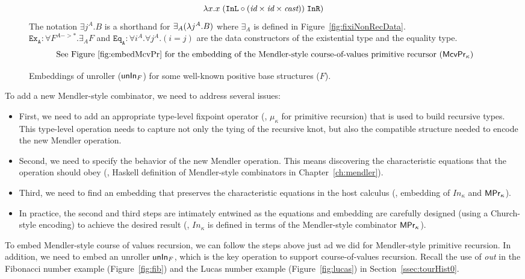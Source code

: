 {\begin{landscape}
\begin{figure}
\[\lambda x. x \;(\texttt{InL}\circ
		(\textit{id}\times\textit{id}\times\textit{cast}))
	\;\texttt{InR})
\]
The notation $\exists j^A.B$ is a shorthand for $\exists_A(\lambda j^A.B)$
where $\exists_A$ is defined in Figure~\ref{fig:fixiNonRecData}.\\
$\mathtt{Ex_{A}} : \forall F^{A -> *}.\exists_A F$ and
$\mathtt{Eq_{A}} : \forall i^A.\forall j^A.(i=j)$ are
the data constructors of the existential type and the equality type.
\[\text{
See Figure \ref{fig:embedMcvPr} for the embedding of the Mendler-style
course-of-values primitive recursor ($\mathsf{McvPr}_\kappa$)}
\]
\caption{Embeddings of unroller ($\mathsf{unIn}_F$)
	for some well-known positive base structures ($F$).}
\label{fig:unInExamples}
\end{figure}

\end{landscape}
} %

To add a new Mendler-style combinator, we need to address several issues:
\begin{itemize}
\item First, we need to add an appropriate type-level fixpoint operator
	(\eg, $\mu_\kappa$ for primitive recursion)
that is used to build recursive types. This type-level operation needs to
capture not only the tying of the recursive knot, but also the compatible
structure needed to encode the new Mendler operation.
\item Second, we need to specify the behavior of the new Mendler operation.
	This means discovering the characteristic equations
	that the operation should obey
	(\eg, Haskell definition of Mendler-style combinators
	in Chapter~\ref{ch:mendler}).
\item Third, we need to find an embedding that preserves
	the characteristic equations in the host calculus
	(\eg, embedding of $In_\kappa$ and $\mathsf{MPr}_\kappa$).
\item In practice, the second and third steps are intimately entwined as
the equations and embedding are carefully designed
(using a Church-style encoding) to achieve the desired result
(\eg, $In_\kappa$ is defined in terms of
	the Mendler-style combinator $\mathsf{MPr}_\kappa$).
\end{itemize}

To embed Mendler-style course of values recursion, we can follow the steps above
just ad we did for Mendler-style primitive recursion. In addition, we need
to embed an unroller $\mathsf{unIn}_F$, which is the key operation to support
course-of-values recursion. Recall the use of \textit{out} in the Fibonacci
number example (Figure~\ref{fig:fib}) and the Lucas number example
(Figure~\ref{fig:lucas}) in Section~\ref{ssec:tourHist0}.

